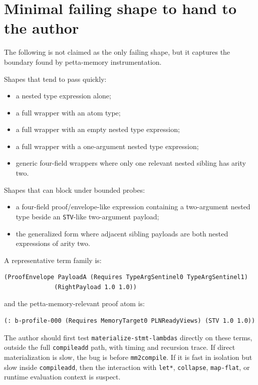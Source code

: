\documentclass[11pt]{article}
\newcommand{\code}[1]{\texttt{#1}}
\begin{document}
\section{Minimal failing shape to hand to the author}

The following is not claimed as the only failing shape, but it captures the
boundary found by petta-memory instrumentation.

Shapes that tend to pass quickly:
\begin{itemize}
  \item a nested type expression alone;
  \item a full wrapper with an atom type;
  \item a full wrapper with an empty nested type expression;
  \item a full wrapper with a one-argument nested type expression;
  \item generic four-field wrappers where only one relevant nested sibling has
  arity two.
\end{itemize}

Shapes that can block under bounded probes:
\begin{itemize}
  \item a four-field proof/envelope-like expression containing a two-argument
  nested type beside an \code{STV}-like two-argument payload;
  \item the generalized form where adjacent sibling payloads are both nested
  expressions of arity two.
\end{itemize}

A representative term family is:
\begin{verbatim}
(ProofEnvelope PayloadA (Requires TypeArgSentinel0 TypeArgSentinel1)
              (RightPayload 1.0 1.0))
\end{verbatim}

and the petta-memory-relevant proof atom is:
\begin{verbatim}
(: b-profile-000 (Requires MemoryTarget0 PLNReadyViews) (STV 1.0 1.0))
\end{verbatim}

The author should first test \code{materialize-stmt-lambdas} directly on these
terms, outside the full \code{compileadd} path, with timing and recursion trace.
If direct materialization is slow, the bug is before \code{mm2compile}.  If it is
fast in isolation but slow inside \code{compileadd}, then the interaction with
\code{let*}, \code{collapse}, \code{map-flat}, or runtime evaluation context is
suspect.
\end{document}
